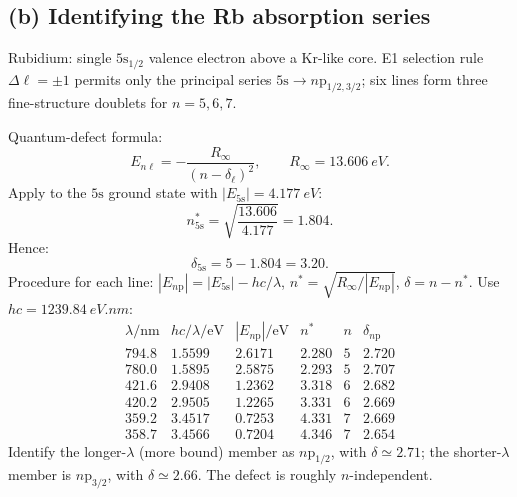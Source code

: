 \documentclass[11pt]{article}
\begin{document}
\subsection*{(b) Identifying the Rb absorption series}

Rubidium: single $5\mathrm{s}_{1/2}$ valence electron above a Kr-like core. E1 selection rule $\Delta\ell=\pm 1$ permits only the principal series $5\mathrm{s}\to n\mathrm{p}_{1/2,3/2}$; six lines form three fine-structure doublets for $n=5,6,7$.

Quantum-defect formula:
\begin{equation}
E_{n\ell}=-\frac{R_{\infty}}{(n-\delta_{\ell})^{2}},\qquad R_{\infty}=\SI{13.606}{eV}.
\label{eq:QDF}
\end{equation}
Apply to the $5\mathrm{s}$ ground state with $|E_{5\mathrm{s}}|=\SI{4.177}{eV}$:
\begin{equation}
n^{*}_{5\mathrm{s}}=\sqrt{\frac{13.606}{4.177}}=1.804.
\end{equation}
Hence:
\begin{equation}
\delta_{5\mathrm{s}}=5-1.804=3.20.
\label{eq:delta-5s}
\end{equation}
Procedure for each line: $|E_{n\mathrm{p}}|=|E_{5\mathrm{s}}|-hc/\lambda$, $n^{*}=\sqrt{R_{\infty}/|E_{n\mathrm{p}}|}$, $\delta=n-n^{*}$. Use $hc=\SI{1239.84}{eV.nm}$:
\begin{equation}
\begin{array}{c|c|c|c|c|c}
\lambda/\mathrm{nm} & hc/\lambda/\mathrm{eV} & |E_{n\mathrm{p}}|/\mathrm{eV} & n^{*} & n & \delta_{n\mathrm{p}} \\ \hline
794.8 & 1.5599 & 2.6171 & 2.280 & 5 & 2.720 \\
780.0 & 1.5895 & 2.5875 & 2.293 & 5 & 2.707 \\
421.6 & 2.9408 & 1.2362 & 3.318 & 6 & 2.682 \\
420.2 & 2.9505 & 1.2265 & 3.331 & 6 & 2.669 \\
359.2 & 3.4517 & 0.7253 & 4.331 & 7 & 2.669 \\
358.7 & 3.4566 & 0.7204 & 4.346 & 7 & 2.654
\end{array}
\label{eq:Rb-table}
\end{equation}
Identify the longer-$\lambda$ (more bound) member as $n\mathrm{p}_{1/2}$, with $\delta\simeq 2.71$; the shorter-$\lambda$ member is $n\mathrm{p}_{3/2}$, with $\delta\simeq 2.66$. The defect is roughly $n$-independent.
\end{document}

